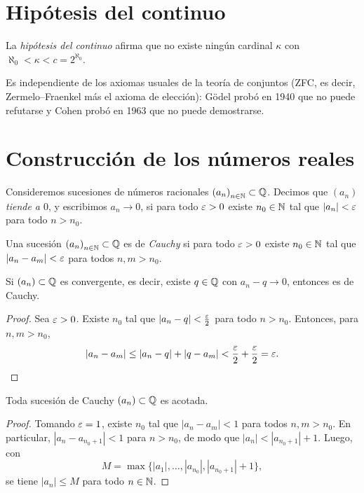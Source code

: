 \section{Hipótesis del continuo}

La \emph{hipótesis del continuo} afirma que no existe ningún cardinal \(\kappa\) con \(\aleph_0 < \kappa < c = 2^{\aleph_0}\).

Es independiente de los axiomas usuales de la teoría de conjuntos (ZFC, es decir, Zermelo--Fraenkel más el axioma de elección): Gödel probó en 1940 que no puede refutarse y Cohen probó en 1963 que no puede demostrarse.

\section{Construcción de los números reales}

Consideremos sucesiones de números racionales \({(a_n)}_{n \in \mathbb{N}} \subset \mathbb{Q}\). Decimos que \({(a_n)}\) \emph{tiende a \(0\)}, y escribimos \(a_n \to 0\), si para todo \(\varepsilon > 0\) existe \(n_0 \in \mathbb{N}\) tal que \(|a_n| < \varepsilon\) para todo \(n > n_0\).

\begin{definition}
  Una sucesión \({(a_n)}_{n \in \mathbb{N}} \subset \mathbb{Q}\) es de \emph{Cauchy} si para todo \(\varepsilon > 0\) existe \(n_0 \in \mathbb{N}\) tal que \(|a_n - a_m| < \varepsilon\) para todos \(n, m > n_0\).
\end{definition}

\begin{theorem}
  Si \({(a_n)} \subset \mathbb{Q}\) es convergente, es decir, existe \(q \in \mathbb{Q}\) con \(a_n - q \to 0\), entonces es de Cauchy.
\end{theorem}

\begin{proof}
  Sea \(\varepsilon > 0\). Existe \(n_0\) tal que \(|a_n - q| < \frac{\varepsilon}{2}\) para todo \(n > n_0\). Entonces, para \(n, m > n_0\),
  \[
    |a_n - a_m| \leq |a_n - q| + |q - a_m| < \frac{\varepsilon}{2} + \frac{\varepsilon}{2} = \varepsilon. \qedhere
  \]
\end{proof}

\begin{theorem}
  Toda sucesión de Cauchy \({(a_n)} \subset \mathbb{Q}\) es acotada.
\end{theorem}

\begin{proof}
  Tomando \(\varepsilon = 1\), existe \(n_0\) tal que \(|a_n - a_m| < 1\) para todos \(n, m > n_0\). En particular, \(|a_n - a_{n_0 + 1}| < 1\) para \(n > n_0\), de modo que \(|a_n| < |a_{n_0 + 1}| + 1\). Luego, con
  \[
    M = \max\{ |a_1|, \dots, |a_{n_0}|, |a_{n_0 + 1}| + 1 \},
  \]
  se tiene \(|a_n| \leq M\) para todo \(n \in \mathbb{N}\).
\end{proof}

